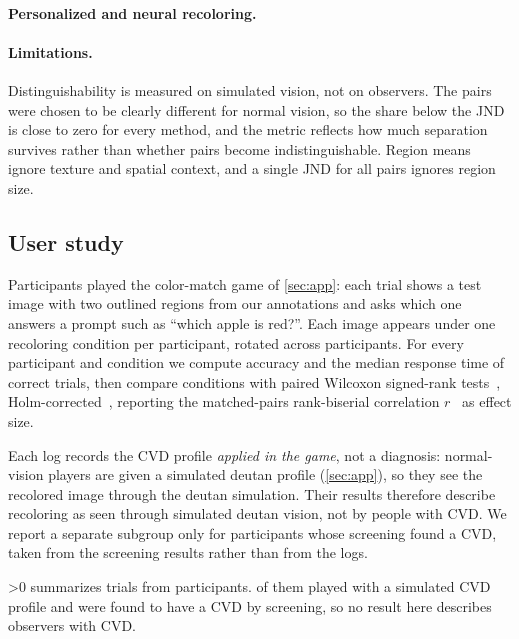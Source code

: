 \paragraph{Personalized and neural recoloring.}
\fi

\paragraph{Limitations.}
Distinguishability is measured on simulated vision, not on observers. The pairs were chosen to
be clearly different for normal vision, so the share below the JND is close to zero for every
method, and the metric reflects how much separation survives rather than whether pairs become
indistinguishable. Region means ignore texture and spatial context, and a single JND for all
pairs ignores region size.

\subsection{User study}
\label{sec:study}
Participants played the color-match game of \cref{sec:app}: each trial shows a test image with
two outlined regions from our annotations and asks which one answers a prompt such as ``which
apple is red?''. Each image appears under one recoloring condition per participant, rotated
across participants. For every participant and condition we compute accuracy and the median
response time of correct trials, then compare conditions with paired Wilcoxon signed-rank
tests~\cite{wilcoxon1945}, Holm-corrected~\cite{holm1979}, reporting the matched-pairs
rank-biserial correlation $r$~\cite{kerby2014} as effect size.

Each log records the CVD profile \emph{applied in the game}, not a diagnosis: normal-vision
players are given a simulated deutan profile (\cref{sec:app}), so they see the recolored image
through the deutan simulation. Their results therefore describe recoloring as seen through
simulated deutan vision, not by people with CVD. We report a separate subgroup only for
participants whose screening found a CVD, taken from the screening results rather than from
the logs.

\begin{table}[t]
  \centering
  \footnotesize
  
  \caption{Mini-game results per condition (mean $\pm$ SD across participants; median of
  per-participant median response times on correct trials).}
  \label{tab:study}
\end{table}

\ifnum\StudyParticipants>0
 summarizes \StudyTrials{} trials from \StudyParticipants{} participants.
\StudySimulatedParticipants{} of them played with a simulated CVD profile and
\StudyCvdParticipants{} were found to have a CVD by screening\ifnum{},
so no result here describes observers with CVD\fi.
\else
{}
\fi
